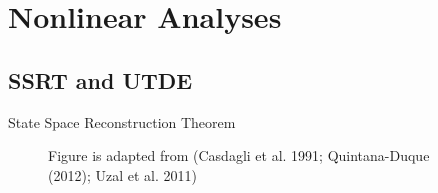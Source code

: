 
\section{Nonlinear Analyses}



\subsection{SSRT and UTDE}
{

\begin{frame}{State Space Reconstruction Theorem}
    \begin{figure}
	{Figure is adapted from (Casdagli et al. 1991; Quintana-Duque (2012); Uzal et al. 2011)} 
   \end{figure}
	
\end{frame}
}



